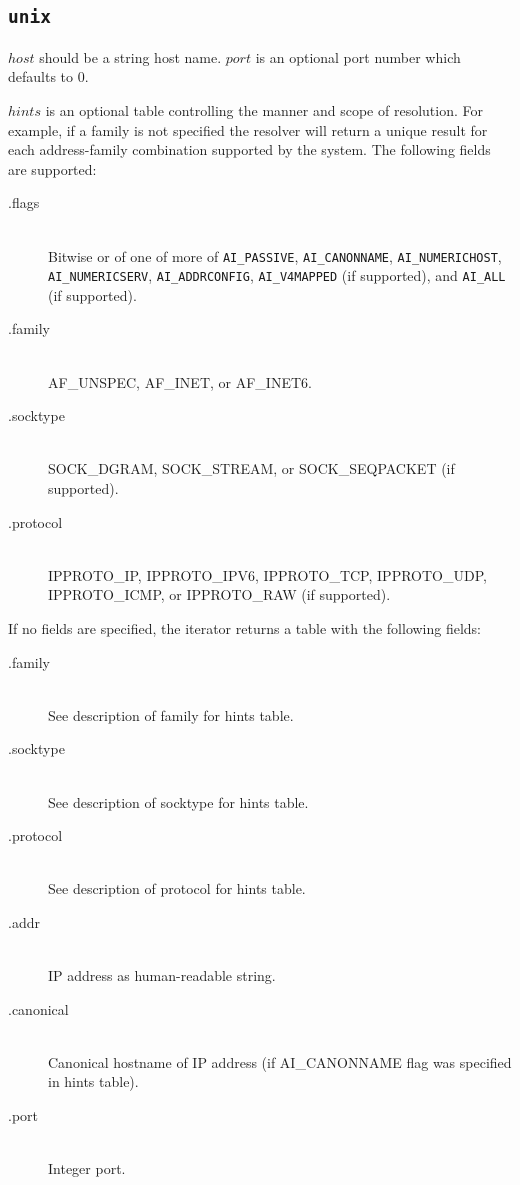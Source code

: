 \documentclass[11pt, oneside]{memoir}
\newcounter{toccols}
\newenvironment{Module}[1]{
	\subsection{\texttt{#1}}
	\addtocontents{toc}{
		\protect\begin{multicols}{\value{toccols}}
	}
}{
	\addtocontents{toc}{\protect\end{multicols}}
}
\begin{document}
\begin{Module}{unix}
$host$ should be a string host name. $port$ is an optional port number which defaults to 0.

$hints$ is an optional table controlling the manner and scope of resolution. For example, if a family is not specified the resolver will return a unique result for each address-family combination supported by the system. The following fields are supported:

\begin{description}
\item[.flags] \hfill \\
Bitwise or of one of more of \texttt{AI\_PASSIVE}, \texttt{AI\_CANONNAME}, \texttt{AI\_NUMERICHOST}, \texttt{AI\_NUMERICSERV}, \texttt{AI\_ADDRCONFIG}, \texttt{AI\_V4MAPPED} (if supported), and \texttt{AI\_ALL} (if supported).
\item[.family] \hfill \\
AF\_UNSPEC, AF\_INET, or AF\_INET6.
\item[.socktype] \hfill \\
SOCK\_DGRAM, SOCK\_STREAM, or SOCK\_SEQPACKET (if supported).
\item[.protocol] \hfill \\
IPPROTO\_IP, IPPROTO\_IPV6, IPPROTO\_TCP, IPPROTO\_UDP, IPPROTO\_ICMP, or IPPROTO\_RAW (if supported).
\end{description}

If no fields are specified, the iterator returns a table with the following fields:

\begin{description}
\item[.family] \hfill \\
See description of family for hints table.
\item[.socktype] \hfill \\
See description of socktype for hints table.
\item[.protocol] \hfill \\
See description of protocol for hints table. 
\item[.addr] \hfill \\
IP address as human-readable string.
\item[.canonical] \hfill \\
Canonical hostname of IP address (if AI\_CANONNAME flag was specified in hints table).
\item[.port] \hfill \\
Integer port.
\end{description}


\end{Module}
\end{document}
